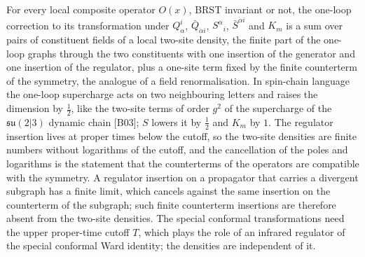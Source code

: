 \begin{remark}
For every local composite operator $O(x)$, BRST invariant or not, the one-loop correction to its transformation under $Q^i_\alpha$, $\bar Q_{\dot\alpha i}$, $S^\alpha{}_i$, $\bar S^{\dot\alpha i}$ and $K_m$ is a sum over pairs of constituent fields of a local two-site density, the finite part of the one-loop graphs through the two constituents with one insertion of the generator and one insertion of the regulator, plus a one-site term fixed by the finite counterterm of the symmetry, the analogue of a field renormalisation. In spin-chain language the one-loop supercharge acts on two neighbouring letters and raises the dimension by $\tfrac12$, like the two-site terms of order $g^2$ of the supercharge of the $\mathfrak{su}(2|3)$ dynamic chain [B03]; $S$ lowers it by $\tfrac12$ and $K_m$ by $1$. The regulator insertion lives at proper times below the cutoff, so the two-site densities are finite numbers without logarithms of the cutoff, and the cancellation of the poles and logarithms is the statement that the counterterms of the operators are compatible with the symmetry. A regulator insertion on a propagator that carries a divergent subgraph has a finite limit, which cancels against the same insertion on the counterterm of the subgraph; such finite counterterm insertions are therefore absent from the two-site densities. The special conformal transformations need the upper proper-time cutoff $T$, which plays the role of an infrared regulator of the special conformal Ward identity; the densities are independent of it.
\end{remark}

